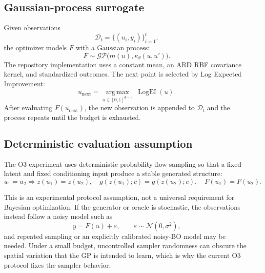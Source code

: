 \documentclass[11pt]{article}
\DeclareMathOperator{\LogEI}{LogEI}
\begin{document}
\subsection{Gaussian-process surrogate}

Given observations
\begin{equation}
    \mathcal{D}_t=\{(u_i,y_i)\}_{i=1}^{t},
    \label{eq:bo-data}
\end{equation}
the optimizer models \(F\) with a Gaussian process:
\begin{equation}
    F\sim\mathcal{GP}\bigl(m(u),\kappa_\theta(u,u')\bigr).
    \label{eq:gp}
\end{equation}
The repository implementation uses a constant mean, an ARD RBF covariance
kernel, and standardized outcomes.  The next point is selected by Log
Expected Improvement:
\begin{equation}
    u_{\mathrm{next}}
    =\underset{u\in[0,1]^{d-1}}{\operatorname{arg\,max}}\;\LogEI(u).
    \label{eq:logei}
\end{equation}
After evaluating \(F(u_{\mathrm{next}})\), the new observation is appended to
\(\mathcal{D}_t\) and the process repeats until the budget is exhausted.

\subsection{Deterministic evaluation assumption}

The O3 experiment uses deterministic probability-flow sampling so that a fixed
latent and fixed conditioning input produce a stable generated structure:
\begin{equation}
    u_1=u_2
    \Longrightarrow
    z(u_1)=z(u_2),\quad
    g(z(u_1);c)=g(z(u_2);c),\quad
    F(u_1)=F(u_2).
    \label{eq:deterministic-evaluation}
\end{equation}

This is an experimental protocol assumption, not a universal requirement for
Bayesian optimization.  If the generator or oracle is stochastic, the
observations instead follow a noisy model such as
\begin{equation}
    y=F(u)+\varepsilon,
    \qquad \varepsilon\sim\mathcal{N}(0,\sigma^2),
    \label{eq:noisy-objective}
\end{equation}
and repeated sampling or an explicitly calibrated noisy-BO model may be
needed.  Under a small budget, uncontrolled sampler randomness can obscure
the spatial variation that the GP is intended to learn, which is why the
current O3 protocol fixes the sampler behavior.
\end{document}
